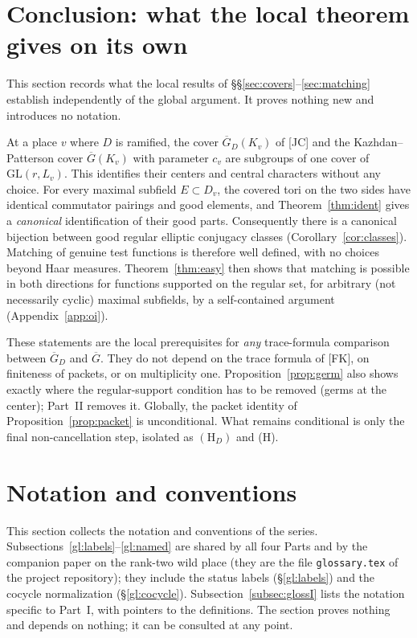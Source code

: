 \documentclass[12pt]{article}
\newcommand{\ov}[1]{\overline{#1}}
\newcommand{\GL}{\mathrm{GL}}
\newcommand{\Gb}{\ov{G}}
\newcommand{\GDb}{\ov{G}_D}
\theoremstyle{plain}
\theoremstyle{definition}
\begin{document}
\section{Conclusion: what the local theorem gives on its own}\label{sec:conclusion}
This section records what the local results of \S\S\ref{sec:covers}--\ref{sec:matching} establish independently of the global argument. It proves nothing new and introduces no notation.

At a place $v$ where $D$ is ramified, the cover $\GDb(K_v)$ of [JC] and the Kazhdan--Patterson cover $\Gb(K_v)$ with parameter $c_v$ are subgroups of one cover of $\GL(r,L_v)$. This identifies their centers and central characters without any choice. For every maximal subfield $E\subset D_v$, the covered tori on the two sides have identical commutator pairings and good elements, and Theorem~\ref{thm:ident} gives a \emph{canonical} identification of their good parts. Consequently there is a canonical bijection between good regular elliptic conjugacy classes (Corollary~\ref{cor:classes}). Matching of genuine test functions is therefore well defined, with no choices beyond Haar measures. Theorem~\ref{thm:easy} then shows that matching is possible in both directions for functions supported on the regular set, for arbitrary (not necessarily cyclic) maximal subfields, by a self-contained argument (Appendix~\ref{app:oi}).

These statements are the local prerequisites for \emph{any} trace-formula comparison between $\GDb$ and $\Gb$. They do not depend on the trace formula of [FK], on finiteness of packets, or on multiplicity one. Proposition~\ref{prop:germ} also shows exactly where the regular-support condition has to be removed (germs at the center); Part~II removes it. Globally, the packet identity of Proposition~\ref{prop:packet} is unconditional. What remains conditional is only the final non-cancellation step, isolated as $(\mathrm H_D)$ and (H).

\section{Notation and conventions}\label{sec:glossary}
This section collects the notation and conventions of the series. Subsections~\ref{gl:labels}--\ref{gl:named} are shared by all four Parts and by the companion paper on the rank-two wild place (they are the file \texttt{glossary.tex} of the project repository); they include the status labels (\S\ref{gl:labels}) and the cocycle normalization (\S\ref{gl:cocycle}). Subsection~\ref{subsec:glossI} lists the notation specific to Part~I, with pointers to the definitions. The section proves nothing and depends on nothing; it can be consulted at any point.
\end{document}
